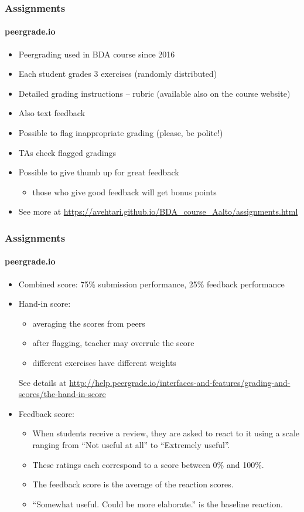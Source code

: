 \documentclass[english]{beamer}
\begin{document}
\begin{frame}
  \frametitle{Assignments}  %
  \framesubtitle{peergrade.io}
  \begin{itemize}
  \item Peergrading used in BDA course since 2016
  \item Each student grades 3 exercises (randomly distributed)
  \item Detailed grading instructions -- rubric (available also on the course website)
  \item Also text feedback
  \item Possible to flag inappropriate grading (please, be polite!)
  \item TAs check flagged gradings
  \item Possible to give thumb up for great feedback
    \begin{itemize}
    \item those who give good feedback will get bonus points
    \end{itemize}
  \item See more at
    \url{https://avehtari.github.io/BDA_course_Aalto/assignments.html}
  \end{itemize}
  
\end{frame}

\begin{frame}
  \frametitle{Assignments}  %
  \framesubtitle{peergrade.io}

  \begin{itemize}
  \item Combined score: 75\% submission performance, 25\% feedback performance
    \pause
  \item Hand-in score:
    \begin{itemize}
    \item averaging the scores from peers
    \item after flagging, teacher may overrule the score
    \item different exercises have different weights
    \end{itemize}
    See details at \url{http://help.peergrade.io/interfaces-and-features/grading-and-scores/the-hand-in-score}
    \pause
  \item Feedback score:
    \begin{itemize}
    \item When students receive a review, they are asked to react to
      it using a scale ranging from ``Not useful at all'' to ``Extremely
      useful''.
    \item These ratings each correspond to a score between 0\% and 100\%.
    \item The feedback score is the average of the reaction scores.
    \item ``Somewhat useful. Could be more elaborate.'' is the
      baseline reaction.
    \end{itemize}
    
  \end{itemize}
  
\end{frame}
\end{document}
